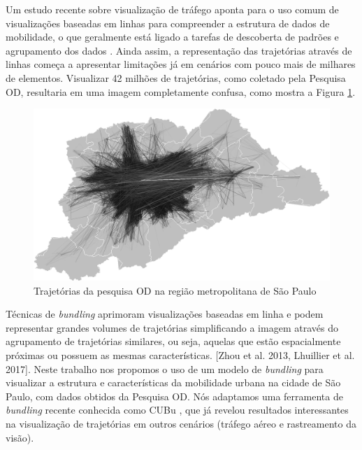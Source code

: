 Um estudo recente sobre visualização de tráfego aponta para o uso comum de
visualizações baseadas em linhas para compreender a estrutura de dados de
mobilidade, o que geralmente está ligado a tarefas de descoberta de padrões e
agrupamento dos dados \cite{Chen2015}. Ainda assim, a representação das
trajetórias através de linhas começa a apresentar limitações já em cenários com
pouco mais de milhares de elementos. Visualizar 42 milhões de trajetórias, como
coletado pela Pesquisa OD, resultaria em uma imagem completamente confusa, como
mostra a Figura \ref{fig:cluttered-graph}.

\begin{figure}[!htb]
  \centering
  \includegraphics[width=150mm]{../figuras/unbundled-edges+grayscale+512px.png}
  \caption[Trajetórias da pesquisa OD na região metropolitana de S\~ao Paulo]{Trajetórias da pesquisa
OD na região metropolitana de S\~ao Paulo}
  \label{fig:cluttered-graph}
\end{figure}

 Técnicas de \emph{bundling} aprimoram visualizações baseadas em linha e podem
representar grandes volumes de trajetórias simplificando a imagem através do
agrupamento de trajetórias similares, ou seja, aquelas que estão espacialmente
próximas ou possuem as mesmas características.  [Zhou et al. 2013, Lhuillier et
al. 2017]. Neste trabalho nos propomos o uso de um modelo de \emph{bundling}
para visualizar a estrutura e características da mobilidade urbana na cidade
de S\~ao Paulo, com dados obtidos da Pesquisa OD. Nós adaptamos uma ferramenta
de \emph{bundling} recente conhecida como CUBu \cite{VanDerZwan2016}, que já
revelou resultados interessantes na visualização de trajetórias em outros cenários
(tráfego aéreo e rastreamento da visão). 

